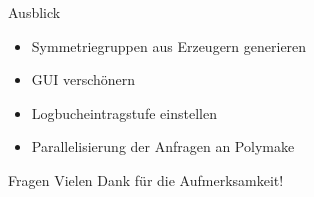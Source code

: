 \documentclass[ucs,11pt]{beamer}
\begin{document}
\begin{frame}{Ausblick}
\begin{itemize}
	\item Symmetriegruppen aus Erzeugern generieren
	\item GUI verschönern
	\item Logbucheintragstufe einstellen
	\item Parallelisierung der Anfragen an Polymake
\end{itemize}
\end{frame}


\begin{frame}[t]{Fragen}
\vspace{1cm}
\huge{Vielen Dank für die Aufmerksamkeit!} \\
\vspace{1cm}
\end{frame}
\end{document}
